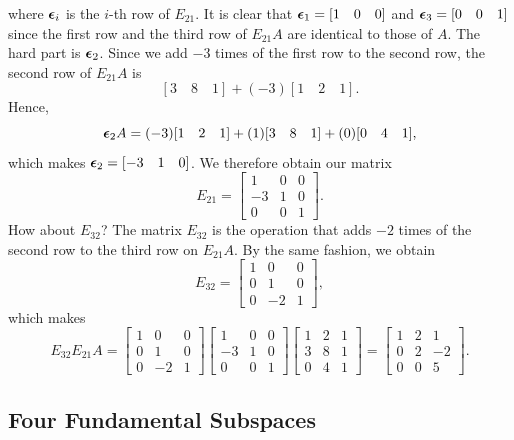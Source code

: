 \documentclass[11pt]{article}
\theoremstyle{break}
\theoremstyle{no_label}
\newcommand{\bfepsilon}{\text{\boldmath$\epsilon$}}
\numberwithin{equation}{section}
\begin{document}
where $\bfepsilon_i$ is the $i$-th row of $E_{21}$. It is clear that $\bfepsilon_1=[1\quad 0\quad 0]$ and $\bfepsilon_3=[0\quad 0\quad 1]$ since the first row and the third row of $E_{21}A$ are identical to those of $A$. The hard part is $\bfepsilon_2$. Since we add $-3$ times of the first row to the second row, the second row of $E_{21}A$ is $$[3\quad 8\quad 1]+(-3)[1\quad 2\quad 1].$$ Hence, $$\bfepsilon_2 A=(-3)[1\quad 2\quad 1]+(1)[3\quad 8\quad 1]+(0)[0\quad 4\quad 1],$$ which makes $\bfepsilon_2=[-3\quad 1\quad 0]$. We therefore obtain our matrix $$E_{21}=\begin{bmatrix}
    1 & 0 & 0 \\
    -3 & 1 & 0 \\
    0 & 0 & 1
\end{bmatrix}.$$ How about $E_{32}$? The matrix $E_{32}$ is the operation that adds $-2$ times of the second row to the third row on $E_{21}A$. By the same fashion, we obtain $$E_{32}=\begin{bmatrix}
    1 & 0 & 0 \\
    0 & 1 & 0 \\
    0 & -2 & 1
\end{bmatrix},$$ which makes $$E_{32}E_{21}A=\begin{bmatrix}
    1 & 0 & 0 \\
    0 & 1 & 0 \\
    0 & -2 & 1
\end{bmatrix}\begin{bmatrix}
    1 & 0 & 0 \\
    -3 & 1 & 0 \\
    0 & 0 & 1
\end{bmatrix}\begin{bmatrix}
    1 & 2 & 1 \\
    3 & 8 & 1 \\
    0 & 4 & 1
\end{bmatrix}=\begin{bmatrix}
    1 & 2 & 1 \\
    0 & 2 & -2 \\
    0 & 0 & 5
\end{bmatrix}.$$

\subsection{Four Fundamental Subspaces}
\end{document}
